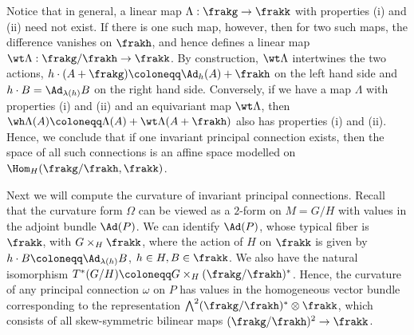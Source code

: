 \begin{rem}
    Notice that in general, a linear map $\Lambda:\frakg\to \frakk$ with properties (i) and (ii) need not exist. If there is one such map, however, then for two such maps, the difference vanishes on $\frakh$, and hence defines a linear map $\wt\Lambda:\frakg\slash\frakh\to \frakk$. By construction, $\wt\Lambda$ intertwines the two actions, $h\cdot (A+\frakg)\coloneqq \Ad_h(A)+\frakh$ on the left hand side and $h\cdot B=\Ad_{\lambda(h)}B$ on the right hand side. Conversely, if we have a map $\Lambda$ with properties (i) and (ii) and an equivariant map $\wt\Lambda$, then $\wh\Lambda(A)\coloneqq \Lambda(A)+\wt\Lambda(A+\frakh)$ also has properties (i) and (ii). Hence, we conclude that if one invariant principal connection exists, then the space of all such connections is an affine space modelled on $\Hom_H(\frakg\slash\frakh,\frakk)$.
\end{rem}



Next we will compute the curvature of invariant principal connections. Recall that the curvature form $\Omega$ can be viewed as a $2$-form on $M=G\slash H$ with values in the adjoint bundle $\Ad(P)$. We can identify $\Ad(P)$, whose typical fiber is $\frakk$, with $G\times_H \frakk$, where the action of $H$ on $\frakk$ is given by $h\cdot B\coloneqq \Ad_{\lambda(h)}B$, $h\in H, B\in\frakk$. We also have the natural isomorphism $T^\ast(G\slash H)\coloneqq G\times_H (\frakg\slash\frakh)^\ast$. Hence, the curvature of any principal connection $\omega$ on $P$ has values in the homogeneous vector bundle corresponding to the representation $\bigwedge^2(\frakg\slash\frakh)^\ast\otimes\frakk$, which consists of all skew-symmetric bilinear maps $(\frakg\slash\frakh)^2\to\frakk$. 

